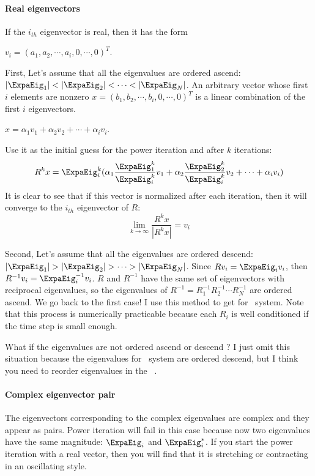 		\paragraph{Real eigenvectors}
			If the $i_{th}$ eigenvector is real, then it has the form
			\begin{center}
				$v_{i}=(a_{1},a_{2},\cdots,a_{i},0,\cdots, 0)^{T}$.
			\end{center}
			First, Let's assume that all the eigenvalues are ordered ascend:
			$|\ExpaEig_{1}|<|\ExpaEig_{2}|<\cdots<|\ExpaEig_{N}|$.
			An arbitrary vector whose first $i$ elements are nonzero $x=(b_{1},b_{2},\cdots,b_{i},0,\cdots, 0)^{T}$
			is a linear combination of the first $i$ eigenvectors.
			\begin{center}
				$x=\alpha_{1}v_{1}+\alpha_{2}v_{2}+\cdots+\alpha_{i}v_{i}$.
			\end{center}
			Use it as the initial guess for the power iteration and after $k$ iterations:	
			\[
			R^{k}x=\ExpaEig_{i}^{k}(\alpha_{1}\frac{\ExpaEig_{1}^{k}}{\ExpaEig_{i}^{k}}v_{1}
					+\alpha_{2}\frac{\ExpaEig_{2}^{k}}{\ExpaEig_{i}^{k}}v_{2}
					+\cdots
					+\alpha_{i}v_{i})
			\]
			It is clear to see that if this vector is normalized after each iteration, then it will converge to the
			$i_{th}$ eigenvector of $R$:
			\[
			\lim_{k\to \infty} \frac{R^{k}x}{|R^{k}x|}=v_{i}
			\]

			Second, Let's assume that all the eigenvalues are ordered descend:
			$|\ExpaEig_{1}|>|\ExpaEig_{2}|>\cdots>|\ExpaEig_{N}|$.
			Since $Rv_{i}=\ExpaEig_{i}v_{i}$, then $R^{-1}v_{i}=\ExpaEig_{i}^{-1}v_{i}$. $R$ and $R^{-1}$ have the
			same set of eigenvectors with reciprocal eigenvalues, so the eigenvalues of
			$R^{-1}=R_{1}^{-1}R_{2}^{-1}\cdots R_{N}^{-1}$ are ordered ascend. We go back to the first case!
			I use this method to get {\cLvs} for \KS\ system. Note that this process is numerically
			practicable because each $R_{i}$ is well conditioned if the time step is small enough.

			What if the eigenvalues are not ordered ascend or descend ? I just omit this situation because the
			eigenvalues for \KS\ system are ordered descend, but I think you need to reorder eigenvalues in the
			\psd\ .

		\paragraph{Complex eigenvector pair}
			The eigenvectors corresponding to the complex eigenvalues are complex and they appear as pairs.
			Power iteration will fail in this case because now two eigenvalues have the same magnitude:
			$\ExpaEig_{i}$ and $\ExpaEig_{i}^{*}$. If you start the power iteration with a real vector, then
			you will find that it is stretching or contracting in an oscillating style.
			
